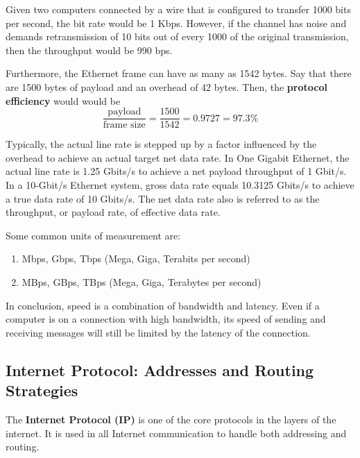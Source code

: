 \documentclass{article}
\begin{document}
  \begin{example}
  Given two computers connected by a wire that is configured to transfer 1000 bits per second, the bit rate would be 1 Kbps. However, if the channel has noise and demands retransmission of 10 bits out of every 1000 of the original transmission, then the throughput would be 990 bps. 

  Furthermore, the Ethernet frame can have as many as 1542 bytes. Say that there are 1500 bytes of payload and an overhead of 42 bytes. Then, the \textbf{protocol efficiency} would would be 
  \[\frac{\text{payload}}{\text{frame size}} = \frac{1500}{1542} = 0.9727 = 97.3\%\]
  \end{example}

  Typically, the actual line rate is stepped up by a factor influenced by the overhead to achieve an actual target net data rate. In One Gigabit Ethernet, the actual line rate is 1.25 Gbits/s to achieve a net payload throughput of 1 Gbit/s. In a 10-Gbit/s Ethernet system, gross data rate equals 10.3125 Gbits/s to achieve a true data rate of 10 Gbits/s. The net data rate also is referred to as the throughput, or payload rate, of effective data rate. 

  Some common units of measurement are: 
  \begin{enumerate}
      \item Mbps, Gbps, Tbps (Mega, Giga, Terabits per second)
      \item MBps, GBps, TBps (Mega, Giga, Terabytes per second)
  \end{enumerate}

  In conclusion, speed is a combination of bandwidth and latency. Even if a computer is on a connection with high bandwidth, its speed of sending and receiving messages will still be limited by the latency of the connection.

  \subsection{Internet Protocol: Addresses and Routing Strategies}
  The \textbf{Internet Protocol (IP)} is one of the core protocols in the layers of the internet. It is used in all Internet communication to handle both addressing and routing. 
\end{document}
